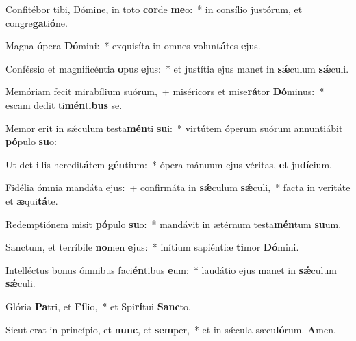 \item Confitébor tibi, Dómine, in toto \textbf{cor}de \textbf{me}o:~* in consílio justórum, et congre\textbf{ga}ti\textbf{ó}ne.

\item Magna \textbf{ó}pera \textbf{Dó}mini:~* exquisíta in omnes volun\textbf{tá}tes \textbf{e}jus.

\item Conféssio et magnificéntia \textbf{o}pus \textbf{e}jus:~* et justítia ejus manet in \textbf{sǽ}culum \textbf{sǽ}culi.

\item Memóriam fecit mirabílium suórum,~+ miséricors et mise\textbf{rá}tor \textbf{Dó}minus:~* escam dedit ti\textbf{mén}ti\textbf{bus} se.

\item Memor erit in sǽculum testa\textbf{mén}ti \textbf{su}i:~* virtútem óperum suórum annuntiábit \textbf{pó}pulo \textbf{su}o:

\item Ut det illis heredi\textbf{tá}tem \textbf{gén}tium:~* ópera mánuum ejus véritas, \textbf{et} ju\textbf{dí}cium.

\item Fidélia ómnia mandáta ejus:~+ confirmáta in \textbf{sǽ}culum \textbf{sǽ}culi,~* facta in veritáte et \textbf{æ}qui\textbf{tá}te.

\item Redemptiónem misit \textbf{pó}pulo \textbf{su}o:~* mandávit in ætérnum testa\textbf{mén}tum \textbf{su}um.

\item {} Sanctum, et terríbile \textbf{no}men \textbf{e}jus:~* inítium sapiéntiæ \textbf{ti}mor \textbf{Dó}mini.

\item Intelléctus bonus ómnibus faci\textbf{én}tibus \textbf{e}um:~* laudátio ejus manet in \textbf{sǽ}culum \textbf{sǽ}culi.

\item Glória \textbf{Pa}tri, et \textbf{Fí}lio,~* et Spi\textbf{rí}tui \textbf{Sanc}to.

\item Sicut erat in princípio, et \textbf{nunc}, et \textbf{sem}per,~* et in sǽcula sæcu\textbf{ló}rum. \textbf{A}men.
